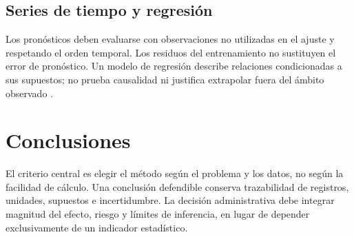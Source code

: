 {\subsection{Series de tiempo y regresión}
Los pronósticos deben evaluarse con observaciones no utilizadas en el ajuste y respetando el orden temporal. Los residuos del entrenamiento no sustituyen el error de pronóstico. Un modelo de regresión describe relaciones condicionadas a sus supuestos; no prueba causalidad ni justifica extrapolar fuera del ámbito observado \citep{hyndmanForecasting2021}.
\section{Conclusiones}
El criterio central es elegir el método según el problema y los datos, no según la facilidad de cálculo. Una conclusión defendible conserva trazabilidad de registros, unidades, supuestos e incertidumbre. La decisión administrativa debe integrar magnitud del efecto, riesgo y límites de inferencia, en lugar de depender exclusivamente de un indicador estadístico.
}
